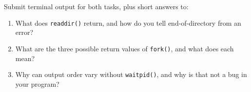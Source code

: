 \begin{labdeliverable}
Submit terminal output for both tasks, plus short answers to:
\begin{enumerate}
  \item What does \texttt{readdir()} return, and how do you tell end-of-directory from an error?
  \item What are the three possible return values of \texttt{fork()}, and what does each mean?
  \item Why can output order vary without \texttt{waitpid()}, and why is that not a bug in your program?
\end{enumerate}
\end{labdeliverable}
